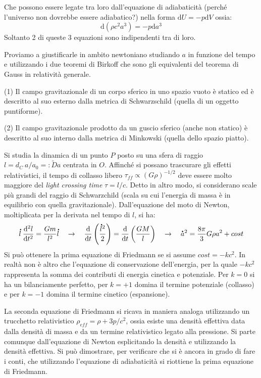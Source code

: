 Che possono essere legate tra loro dall'equazione di adiabaticità (perché l'universo non dovrebbe essere adiabatico?) nella forma $\mathrm{d}U=-p\mathrm{d}V$ ossia:
\begin{equation}
    \mathrm{d}(\rho c^2 a^3)=-p\mathrm{d}a^3
\end{equation}
Soltanto 2 di queste 3 equazioni sono indipendenti tra di loro.

\vspace{1em}
Proviamo a giustificarle in ambito newtoniano studiando $a$ in funzione del tempo e utilizzando i due teoremi di Birkoff che sono gli equivalenti del teorema di Gauss in relatività generale.
\begin{theorem}
(1) Il campo gravitazionale di un corpo sferico in uno spazio vuoto è statico ed è descritto al suo esterno dalla metrica di Schwarzschild (quella di un oggetto puntiforme).

(2) Il campo gravitazionale prodotto da un guscio sferico (anche non statico) è descritto al suo interno dalla metrica di Minkowski (quella dello spazio piatto).
\end{theorem}

Si studia la dinamica di un punto $P$ posto su una sfera di raggio $l=d_C\: a/a_0=:\tilde{D}a$ centrata in $O$. Affinché si possano trascurare gli effetti relativistici, il tempo di collasso libero $\tau_{ff}\propto (G\rho)^{-1/2}$ deve essere molto maggiore del \textit{light crossing time} $\tau =l / c$. Detto in altro modo, si considerano scale più grandi del raggio di Schwarzchild (scala su cui l'energia di massa è in equilibrio con quella gravitazionale). Dall'equazione del moto di Newton, moltiplicata per la derivata nel tempo di $l$, si ha:
$$
\accentset{\mbox{\large\bfseries .}}{l}\:\frac{\mathrm{d^2} l}{\mathrm{d} t^2}=\frac{Gm}{l^2}\accentset{\mbox{\large\bfseries .}}{l} \quad \rightarrow \quad \frac{\mathrm{d} }{\mathrm{d} t}\left ( \frac{\accentset{\mbox{\large\bfseries .}}{l}^2}{2} \right )=\frac{\mathrm{d} }{\mathrm{d} t}\left ( \frac{GM}{l} \right ) \quad \rightarrow \quad \accentset{\mbox{\large\bfseries .}}{a}^2 =\frac{8\pi}{3}G\rho a^2+cost
$$
Si può ottenere la prima equazione di Friedmann se si assume $cost=-kc^2$. In realtà non è altro che l'equazione di conservazione dell'energia, per la quale $-kc^2$ rappresenta la somma dei contributi di energia cinetica e potenziale. Per $k=0$ si ha un bilanciamente perfetto, per $k=+1$ domina il termine potenziale (collasso) e per $k=-1$ domina il termine cinetico (espansione).

La seconda equazione di Friedmann si ricava in maniera analoga utilizzando un trucchetto relativistico $\rho_{eff}=\rho+3p/c^2$, ossia esiste una densità effettiva data dalla densità di massa e da un termine relativistico legato alla pressione. Si parte comunque dall'equazione di Newton esplicitando la densità e utilizzando la densità effettiva.
Si può dimostrare, per verificare che si è ancora in grado di fare i conti, che utilizzando l'equazione di adiabaticità si riottiene la prima equazione di Friedmann.


